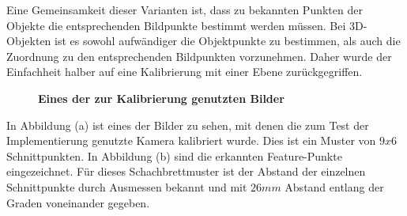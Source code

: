 Eine Gemeinsamkeit dieser Varianten ist, dass zu bekannten Punkten der Objekte die entsprechenden Bildpunkte bestimmt werden müssen.
Bei 3D-Objekten ist es sowohl aufwändiger die Objektpunkte zu bestimmen, als auch die Zuordnung zu den entsprechenden Bildpunkten vorzunehmen. Daher wurde der Einfachheit halber auf eine Kalibrierung mit einer Ebene zurückgegriffen. 
\begin{figure}
\qquad
{}
\caption{\textbf{Eines der zur Kalibrierung genutzten Bilder}}
\label{Fig:calibplane}

\end{figure}
In Abbildung  (a) ist eines der Bilder zu sehen, mit denen die zum Test der Implementierung genutzte Kamera kalibriert wurde. Dies ist ein Muster von $9x6$ Schnittpunkten. In Abbildung   (b) sind die erkannten Feature-Punkte eingezeichnet. Für dieses Schachbrettmuster ist der Abstand der einzelnen Schnittpunkte durch Ausmessen bekannt und mit $26mm$ Abstand entlang der Graden voneinander gegeben. 

